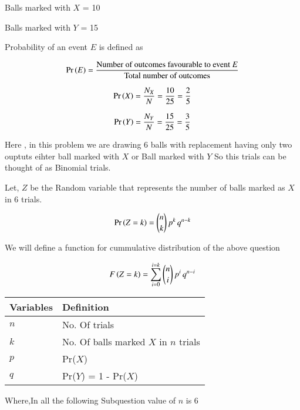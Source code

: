 \documentclass[journal,12pt,twocolumn]{IEEEtran}
\begin{document}
Balls marked with $X$  = 10 


Balls marked with $Y$  = 15 


Probability of an event $E$ is defined as


$$\Pr\left(E\right) = \frac{\text{Number of outcomes favourable to event }E}{\text{Total number of outcomes}}$$

$$\Pr\left(X\right)= \frac{N_X}{N} = \frac{10}{25} = \frac{2}{5}$$

$$\Pr\left(Y\right)= \frac{N_Y}{N} = \frac{15}{25} = \frac{3}{5}$$



Here , in this problem we are drawing 6 balls with replacement having only two ouptuts eihter ball marked with $X$ or Ball marked with $Y$ So this trials can be thought of as Binomial trials. 


Let, $Z$ be the Random variable that represents the number of balls marked as $X$ in 6 trials.


$$\Pr\left(Z = k\right) = \binom{n}{k}\,p^k\,q^{n-k}$$

We will define a function for cummulative distribution of the above question

$$F\left(Z=k\right) = \sum_{i=0}^{i=k}\binom{n}{i}\,p^i\,q^{n-i}$$ 

\begin{table}[]
	\begin{tabular}{|l|l|}\hline
		Variables	&Definition\\ \hline
		$n$	&No. Of trials\\ \hline
		$k$	&No. Of balls marked $X$ in $n$ trials\\ \hline
		$p$	&Pr($X$)\\ \hline
		$q$	&Pr($Y$) = 1 - Pr($X$)\\	\hline		
	\end{tabular}
\end{table}

%







Where,In all the following Subquestion value of $n$ is 6
\end{document}
